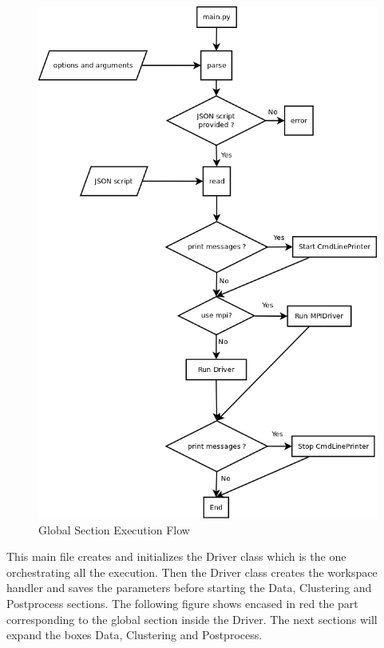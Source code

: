 \begin{figure}[h]
\centering
\includegraphics[height=0.5\paperheight]{img/global.png}
\caption{Global Section Execution Flow}
\vspace{1cm}
\end{figure}


This main file creates and initializes the Driver class which is the one orchestrating all the execution. Then the Driver class creates the workspace handler and saves the parameters before starting the Data, Clustering and Postprocess sections. The following figure shows encased in red the part corresponding to the global section inside the Driver. The next sections will expand the boxes Data, Clustering and Postprocess.

